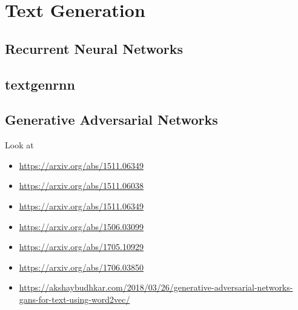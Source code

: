 \section{Text Generation}\label{sec:introduction:text-generation}

\subsection{Recurrent Neural Networks}\label{sec:text-generation:rnns}
\subsection{textgenrnn}\label{sec:text-generation:textgenrnn}
\subsection{Generative Adversarial Networks}\label{sec:text-generation:gans}


Look at
\begin{itemize}
    \item \url{https://arxiv.org/abs/1511.06349}
    \item \url{https://arxiv.org/abs/1511.06038}
    \item \url{https://arxiv.org/abs/1511.06349}
    \item \url{https://arxiv.org/abs/1506.03099}
    \item \url{https://arxiv.org/abs/1705.10929}
    \item \url{https://arxiv.org/abs/1706.03850}
    \item \url{https://akshaybudhkar.com/2018/03/26/generative-adversarial-networks-gans-for-text-using-word2vec/}
\end{itemize}
